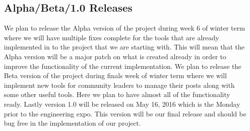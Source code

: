 \documentclass[draftclsnofoot,10pt,onecolumn]{IEEEtran} %
\begin{document}
\subsection{Alpha/Beta/1.0 Releases}
We plan to release the Alpha version of the project during week 6 of winter term where we will have multiple fixes complete for the tools that are already implemented in to the project that we are starting with. This will mean that the Alpha version will be a major patch on what is created already in order to improve the functionality of the current implementation. We plan to release the Beta version of the project during finals week of winter term where we will implement new tools for community leaders to manage their posts along with some other useful tools. Here we plan to have almost all of the functionality ready. Lastly version 1.0 will be released on May 16, 2016 which is the Monday prior to the engineering expo. This version will be our final release and should be bug free in the implementation of our project.
\end{document}
